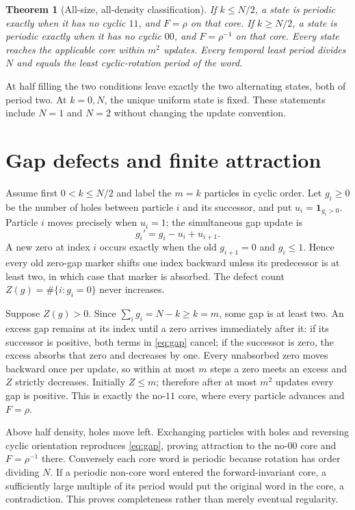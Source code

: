 \documentclass[10pt]{article}
\newtheorem{theorem}{Theorem}
\begin{document}
\begin{theorem}[All-size, all-density classification]
If $k\le N/2$, a state is periodic exactly when it has no cyclic $11$, and
$F=\rho$ on that core. If $k\ge N/2$, a state is periodic exactly when it
has no cyclic $00$, and $F=\rho^{-1}$ on that core. Every state reaches the
applicable core within $m^2$ updates. Every temporal least period divides
$N$ and equals the least cyclic-rotation period of the word.
\end{theorem}

At half filling the two conditions leave exactly the two alternating states,
both of period two. At $k=0,N$, the unique uniform state is fixed. These
statements include $N=1$ and $N=2$ without changing the update convention.

\section{Gap defects and finite attraction}
Assume first $0<k\le N/2$ and label the $m=k$ particles in cyclic order.
Let $g_i\ge0$ be the number of holes between particle $i$ and its successor,
and put $u_i=\mathbf1_{g_i>0}$. Particle $i$ moves precisely when $u_i=1$;
the simultaneous gap update is
\begin{equation}\label{eq:gap}
g_i'=g_i-u_i+u_{i+1}.
\end{equation}
A new zero at index $i$ occurs exactly when the old $g_{i+1}=0$ and
$g_i\le1$. Hence every old zero-gap marker shifts one index backward unless
its predecessor is at least two, in which case that marker is absorbed. The
defect count $Z(g)=\#\{i:g_i=0\}$ never increases.

Suppose $Z(g)>0$. Since $\sum_i g_i=N-k\ge k=m$, some gap is at least two.
An excess gap remains at its index until a zero arrives immediately after it:
if its successor is positive, both terms in \eqref{eq:gap} cancel; if the
successor is zero, the excess absorbs that zero and decreases by one. Every
unabsorbed zero moves backward once per update, so within at most $m$ steps a
zero meets an excess and $Z$ strictly decreases. Initially $Z\le m$;
therefore after at most $m^2$ updates every gap is positive. This is exactly
the no-$11$ core, where every particle advances and $F=\rho$.

Above half density, holes move left. Exchanging particles with holes and
reversing cyclic orientation reproduces \eqref{eq:gap}, proving attraction
to the no-$00$ core and $F=\rho^{-1}$ there. Conversely each core word is
periodic because rotation has order dividing $N$. If a periodic non-core
word entered the forward-invariant core, a sufficiently large multiple of
its period would put the original word in the core, a contradiction. This
proves completeness rather than merely eventual regularity.
\end{document}
